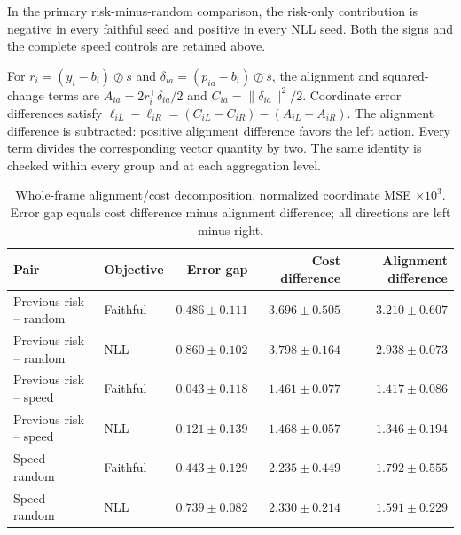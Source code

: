 In the primary risk-minus-random comparison, the risk-only contribution
is negative in every faithful seed and positive in every NLL seed.
Both the signs and the complete speed controls are retained above.


For $r_i=(y_i-b_i)\oslash s$ and $\delta_{ia}=(p_{ia}-b_i)\oslash s$,
the alignment and squared-change terms are
$A_{ia}=2r_i^\top\delta_{ia}/2$ and
$C_{ia}=\|\delta_{ia}\|^2/2$.
Coordinate error differences satisfy
$\ell_{iL}-\ell_{iR}=(C_{iL}-C_{iR})-(A_{iL}-A_{iR})$.
The alignment difference is subtracted: positive alignment difference favors
the left action. Every term divides the corresponding vector quantity by two.
The same identity is checked within every group and at each aggregation level.

\begin{table}[ht]
\centering\small
\caption{Whole-frame alignment/cost decomposition, normalized coordinate MSE
$\times10^3$. Error gap equals cost difference minus alignment difference;
all directions are left minus right.}
\label{tab:optional-exposure-alignment}
\begin{tabular}{llrrr}
\toprule
Pair & Objective & Error gap & Cost difference & Alignment difference\\
\midrule
Previous risk -- random & Faithful & $0.486\pm0.111$ & $3.696\pm0.505$ & $3.210\pm0.607$\\
Previous risk -- random & NLL & $0.860\pm0.102$ & $3.798\pm0.164$ & $2.938\pm0.073$\\
Previous risk -- speed & Faithful & $0.043\pm0.118$ & $1.461\pm0.077$ & $1.417\pm0.086$\\
Previous risk -- speed & NLL & $0.121\pm0.139$ & $1.468\pm0.057$ & $1.346\pm0.194$\\
Speed -- random & Faithful & $0.443\pm0.129$ & $2.235\pm0.449$ & $1.792\pm0.555$\\
Speed -- random & NLL & $0.739\pm0.082$ & $2.330\pm0.214$ & $1.591\pm0.229$\\
\bottomrule
\end{tabular}
\end{table}

